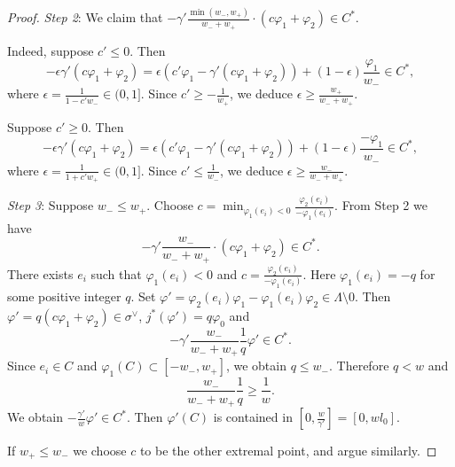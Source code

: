 \documentclass[10pt,a4paper]{amsart}
\begin{document}
\begin{proof}
	{\em Step 2}: We claim that $-\gamma'\frac{\min(w_-,w_+)}{w_-+w_+}\cdot (c\varphi_1+\varphi_2)\in C^*$.
	
	Indeed, suppose $c'\le 0$. Then 
	$$
	-\epsilon\gamma'(c\varphi_1+\varphi_2)=\epsilon(c'\varphi_1-\gamma'(c\varphi_1+\varphi_2))+(1-\epsilon)\frac{\varphi_1}{w_-}\in C^*,
	$$
	where $\epsilon=\frac{1}{1-c'w_-}\in (0,1]$. Since $c'\ge -\frac{1}{w_+}$, we deduce $\epsilon\ge  \frac{w_+}{w_-+w_+}$.
	
	Suppose $c'\ge 0$. Then 
	$$
	-\epsilon\gamma'(c\varphi_1+\varphi_2)=\epsilon(c'\varphi_1-\gamma'(c\varphi_1+\varphi_2))+(1-\epsilon)\frac{-\varphi_1}{w_-}\in C^*,
	$$
	where $\epsilon=\frac{1}{1+c'w_+}\in (0,1]$.
	Since $c'\le \frac{1}{w_-}$, we deduce $\epsilon\ge  \frac{w_-}{w_-+w_+}$.
	
	{\em Step 3}:
	Suppose $w_-\le w_+$. Choose $c=\min_{\varphi_1(e_i)<0}\frac{\varphi_2(e_i)}{-\varphi_1(e_i)}$.
	From Step 2 we have
	$$
	-\gamma'\frac{w_-}{w_-+w_+}\cdot (c\varphi_1+\varphi_2)\in C^*.
	$$
	There exists $e_i$ such that $\varphi_1(e_i)<0$ and $c=\frac{\varphi_2(e_i)}{-\varphi_1(e_i)}$.
	Here $\varphi_1(e_i)=-q$ for some positive integer $q$. Set 
	$\varphi'=\varphi_2(e_i)\varphi_1-\varphi_1(e_i) \varphi_2 \in \Lambda\setminus 0$.
	Then $\varphi'=q(c\varphi_1+\varphi_2)\in \sigma^\vee$, $j^*(\varphi')=q\varphi_0$ and
	$$
	-\gamma'\frac{w_-}{w_-+w_+}\frac{1}{q}\varphi' \in C^*.
	$$
	Since $e_i \in C$ and $\varphi_1(C)\subset [-w_-,w_+]$, 
	we obtain $q\le w_-$. Therefore $q<w$ and 
	$$
	\frac{w_-}{w_-+w_+}\frac{1}{q} \ge  \frac{1}{w}.
	$$
	We obtain $-\frac{\gamma'}{w}\varphi'\in C^*$. Then $\varphi'(C)$ is contained
	in $[0,\frac{w}{\gamma'}]=[0,wl_0]$.
	
	If $w_+\le w_-$ we choose $c$ to be the other extremal point, and argue similarly.
\end{proof}
\end{document}
